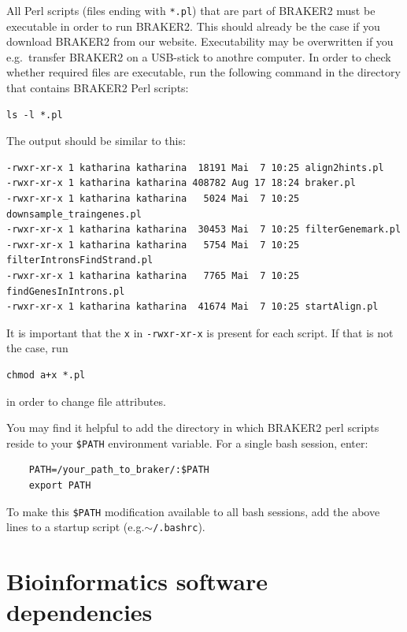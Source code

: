 \documentclass[a4paper,10pt]{report}
\begin{document}
All Perl scripts (files ending with \texttt{*.pl}) that are part of BRAKER2 must be executable in order to run BRAKER2. This should already be the case if you download BRAKER2 from our website. Executability may be overwritten if you e.g.~transfer BRAKER2 on a USB-stick to anothre computer. In order to check whether required files are executable, run the following command in the directory that contains BRAKER2 Perl scripts:

\begin{verbatim}
ls -l *.pl
\end{verbatim}

The output should be similar to this:

\begin{verbatim}
-rwxr-xr-x 1 katharina katharina  18191 Mai  7 10:25 align2hints.pl
-rwxr-xr-x 1 katharina katharina 408782 Aug 17 18:24 braker.pl
-rwxr-xr-x 1 katharina katharina   5024 Mai  7 10:25 downsample_traingenes.pl
-rwxr-xr-x 1 katharina katharina  30453 Mai  7 10:25 filterGenemark.pl
-rwxr-xr-x 1 katharina katharina   5754 Mai  7 10:25 filterIntronsFindStrand.pl
-rwxr-xr-x 1 katharina katharina   7765 Mai  7 10:25 findGenesInIntrons.pl
-rwxr-xr-x 1 katharina katharina  41674 Mai  7 10:25 startAlign.pl
\end{verbatim}

It is important that the \texttt{x} in \texttt{-rwxr-xr-x} is present for each script. If that is not the case, run

\begin{verbatim}
chmod a+x *.pl
\end{verbatim}

in order to change file attributes.

You may find it helpful to add the directory in which BRAKER2 perl scripts reside to 
    your \texttt{\$PATH} environment variable. For a single bash session, enter:

    \begin{verbatim}
    PATH=/your_path_to_braker/:$PATH
    export PATH
    \end{verbatim}
    
To make this \texttt{\$PATH} modification available to all bash sessions, add the above lines to a startup script (e.g.\texttt{$\sim$/.bashrc}).

\section{Bioinformatics software dependencies}
\end{document}
